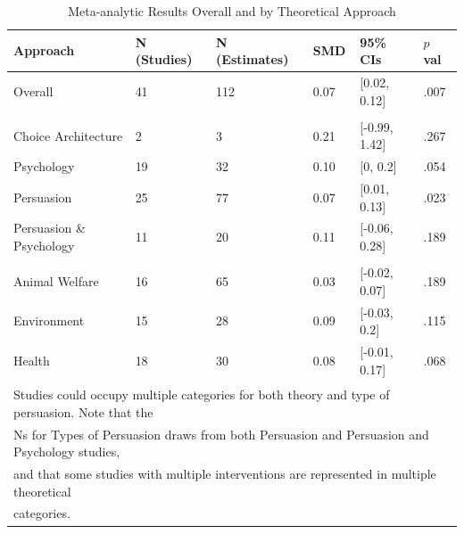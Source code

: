 \documentclass[sn-nature,referee,pdflatex]{sn-jnl}
\begin{document}
\begin{table}[!ht]
\centering
\caption{\label{tab:table_one}Meta-analytic Results Overall and by Theoretical Approach}
\centering
\begin{tabular}[t]{llllll}
\toprule
Approach & N (Studies) & N (Estimates) & SMD & 95\% CIs & $p$ val\\
\midrule
Overall & 41 & 112 & 0.07 & {}[0.02, 0.12] & .007\\
\addlinespace[0.5em]
\multicolumn{6}{l}{\textbf{Theory}}\\
\hspace{1em}Choice Architecture & 2 & 3 & 0.21 & {}[-0.99, 1.42] & .267\\
\hspace{1em}Psychology & 19 & 32 & 0.10 & {}[0, 0.2] & .054\\
\hspace{1em}Persuasion & 25 & 77 & 0.07 & {}[0.01, 0.13] & .023\\
\hspace{1em}Persuasion \& Psychology & 11 & 20 & 0.11 & {}[-0.06, 0.28] & .189\\
\addlinespace[0.5em]
\multicolumn{6}{l}{\textbf{Type of Persuasion}}\\
\hspace{1em}Animal Welfare & 16 & 65 & 0.03 & {}[-0.02, 0.07] & .189\\
\hspace{1em}Environment & 15 & 28 & 0.09 & {}[-0.03, 0.2] & .115\\
\hspace{1em}Health & 18 & 30 & 0.08 & {}[-0.01, 0.17] & .068\\
\bottomrule
\multicolumn{6}{l}{\textsuperscript{} Studies could occupy multiple categories for both theory and type of persuasion. Note that the}\\
\multicolumn{6}{l}{Ns for Types of Persuasion draws from both Persuasion and Persuasion and Psychology studies,}\\
\multicolumn{6}{l}{and that some studies with multiple interventions are represented in multiple theoretical}\\
\multicolumn{6}{l}{categories.}\\
\end{tabular}
\end{table}
\end{document}
